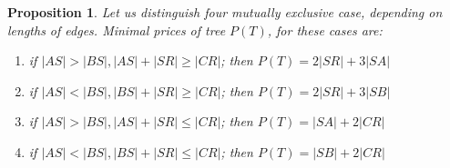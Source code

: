 \documentclass[12pt]{book}
\newcommand{\Ptotal}[1]{P(#1)}
\newtheorem{proposition}{Proposition}
\begin{document}
	\begin{proposition}\label{prop:tp} 
		Let us distinguish four mutually exclusive case, depending on lengths of edges. Minimal prices of tree \(\Ptotal{T}\), for these cases are:
		\begin{enumerate}
		\item if \( |AS| > |BS|, |AS|+|SR| \geq |CR| \); then \(\Ptotal{T} = 2 |SR| + 3 |SA|\)
		\item if \( |AS| < |BS|, |BS|+|SR| \geq |CR| \); then \(\Ptotal{T} = 2 |SR| + 3 |SB|\)
		\item if \( |AS| > |BS|, |AS|+|SR| \leq |CR| \); then \(\Ptotal{T} = |SA| + 2 |CR|\)
		\item if \( |AS| < |BS|, |BS|+|SR| \leq |CR| \); then \(\Ptotal{T} = |SB| + 2 |CR|\)
		\end{enumerate}
	\end{proposition}
\end{document}
